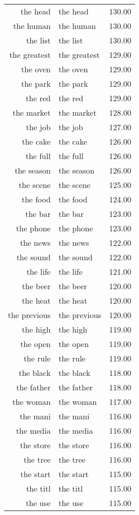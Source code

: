 \begin{table}[ht]
\begin{tabular}{rlr}
  the head & the head & 130.00 \\ 
  the human & the human & 130.00 \\ 
  the list & the list & 130.00 \\ 
  the greatest & the greatest & 129.00 \\ 
  the oven & the oven & 129.00 \\ 
  the park & the park & 129.00 \\ 
  the red & the red & 129.00 \\ 
  the market & the market & 128.00 \\ 
  the job & the job & 127.00 \\ 
  the cake & the cake & 126.00 \\ 
  the full & the full & 126.00 \\ 
  the season & the season & 126.00 \\ 
  the scene & the scene & 125.00 \\ 
  the food & the food & 124.00 \\ 
  the bar & the bar & 123.00 \\ 
  the phone & the phone & 123.00 \\ 
  the news & the news & 122.00 \\ 
  the sound & the sound & 122.00 \\ 
  the life & the life & 121.00 \\ 
  the beer & the beer & 120.00 \\ 
  the heat & the heat & 120.00 \\ 
  the previous & the previous & 120.00 \\ 
  the high & the high & 119.00 \\ 
  the open & the open & 119.00 \\ 
  the rule & the rule & 119.00 \\ 
  the black & the black & 118.00 \\ 
  the father & the father & 118.00 \\ 
  the woman & the woman & 117.00 \\ 
  the mani & the mani & 116.00 \\ 
  the media & the media & 116.00 \\ 
  the store & the store & 116.00 \\ 
  the tree & the tree & 116.00 \\ 
  the start & the start & 115.00 \\ 
  the titl & the titl & 115.00 \\ 
  the use & the use & 115.00 \\ 

\end{tabular}
\end{table}
